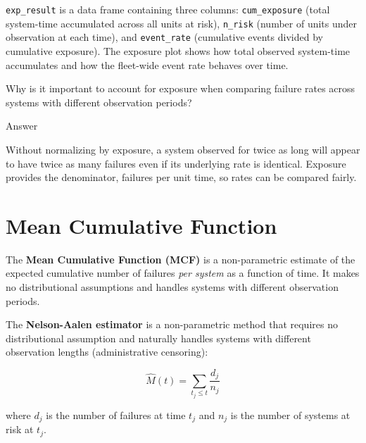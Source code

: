 \documentclass[
  letterpaper,
  DIV=11,
  numbers=noendperiod]{scrreprt}
\begin{document}
\texttt{exp\_result} is a data frame containing three columns:
\texttt{cum\_exposure} (total system-time accumulated across all units
at risk), \texttt{n\_risk} (number of units under observation at each
time), and \texttt{event\_rate} (cumulative events divided by cumulative
exposure). The exposure plot shows how total observed system-time
accumulates and how the fleet-wide event rate behaves over time.

\begin{tcolorbox}[enhanced jigsaw, arc=.35mm, bottomrule=.15mm, bottomtitle=1mm, breakable, colback=white, colbacktitle=quarto-callout-tip-color!10!white, colframe=quarto-callout-tip-color-frame, coltitle=black, left=2mm, leftrule=.75mm, opacityback=0, opacitybacktitle=0.6, rightrule=.15mm, title=\textcolor{quarto-callout-tip-color}{\faLightbulb}\hspace{0.5em}{Review}, titlerule=0mm, toprule=.15mm, toptitle=1mm]

Why is it important to account for exposure when comparing failure rates
across systems with different observation periods?

Answer

Without normalizing by exposure, a system observed for twice as long
will appear to have twice as many failures even if its underlying rate
is identical. Exposure provides the denominator, failures per unit time,
so rates can be compared fairly.

\end{tcolorbox}

\section{Mean Cumulative Function}\label{mean-cumulative-function}

The \textbf{Mean Cumulative Function (MCF)} is a non-parametric estimate
of the expected cumulative number of failures \emph{per system} as a
function of time. It makes no distributional assumptions and handles
systems with different observation periods.

The \textbf{Nelson-Aalen estimator} is a non-parametric method that
requires no distributional assumption and naturally handles systems with
different observation lengths (administrative censoring):

\[\hat{M}(t) = \sum_{t_j \leq t} \frac{d_j}{n_j}\]

where \(d_j\) is the number of failures at time \(t_j\) and \(n_j\) is
the number of systems at risk at \(t_j\).
\end{document}
